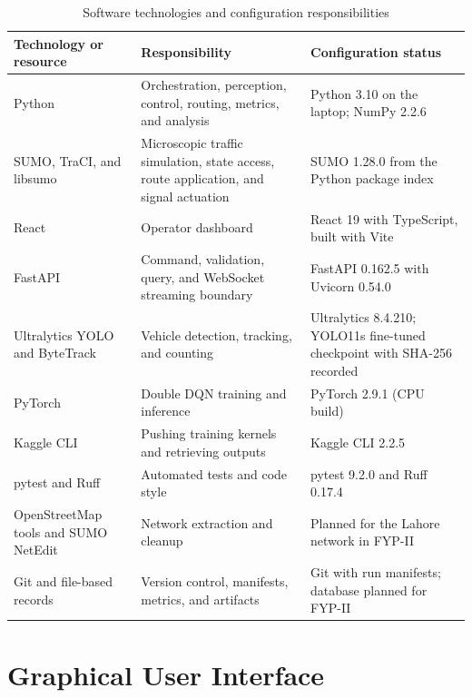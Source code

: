 \begin{table}[htbp]
\centering
\caption{Software technologies and configuration responsibilities}
\label{tab:software}
\begin{tabularx}{\textwidth}{p{}p{}Y}
\toprule
\textbf{Technology or resource} & \textbf{Responsibility} & \textbf{Configuration status}\\
\midrule
Python & Orchestration, perception, control, routing, metrics, and analysis & Python 3.10 on the laptop; NumPy 2.2.6\\
SUMO, TraCI, and libsumo & Microscopic traffic simulation, state access, route application, and signal actuation & SUMO 1.28.0 from the Python package index\\
React & Operator dashboard & React 19 with TypeScript, built with Vite\\
FastAPI & Command, validation, query, and WebSocket streaming boundary & FastAPI 0.162.5 with Uvicorn 0.54.0\\
Ultralytics YOLO and ByteTrack & Vehicle detection, tracking, and counting & Ultralytics 8.4.210; YOLO11s fine-tuned checkpoint with SHA-256 recorded\\
PyTorch & Double DQN training and inference & PyTorch 2.9.1 (CPU build)\\
Kaggle CLI & Pushing training kernels and retrieving outputs & Kaggle CLI 2.2.5\\
pytest and Ruff & Automated tests and code style & pytest 9.2.0 and Ruff 0.17.4\\
OpenStreetMap tools and SUMO NetEdit & Network extraction and cleanup & Planned for the Lahore network in FYP-II\\
Git and file-based records & Version control, manifests, metrics, and artifacts & Git with run manifests; database planned for FYP-II\\
\bottomrule
\end{tabularx}
\end{table}

\section{Graphical User Interface}
\label{sec:gui}

